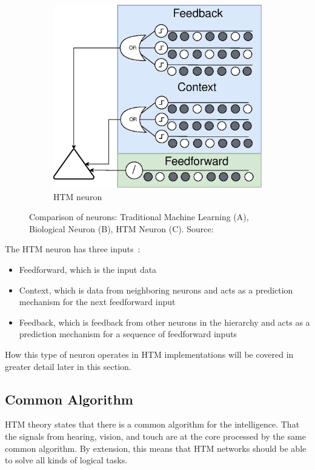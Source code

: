 \begin{figure}[H]
\begin{subfigure}[b]{0.55\linewidth}
        \includegraphics[width=\linewidth]{resources/related_works/neuron_htm}
        \caption[Comparison of neurons]{HTM neuron}
    \end{subfigure}
    \caption[Comparison of Neurons]{Comparison of neurons: Traditional Machine Learning (A), Biological Neuron (B), HTM Neuron (C). Source:~\cite{BAMI}}
    \label{fig:neuron_comparison}
\end{figure}
The HTM neuron has three inputs~\cite{htm_neurons}:
\begin{itemize}
    \item Feedforward, which is the input data
    \item Context, which is data from neighboring neurons and acts as a prediction mechanism for the next feedforward input
    \item Feedback, which is feedback from other neurons in the hierarchy and acts as a prediction mechanism for a sequence of feedforward inputs
\end{itemize}
How this type of neuron operates in HTM implementations will be covered in greater detail later in this section.
\subsection{Common Algorithm}
HTM theory states that there is a common algorithm for the intelligence. That the signals from hearing, vision, and touch are at the core processed by the same common algorithm. By extension, this means that HTM networks should be able to solve all kinds of logical tasks.
